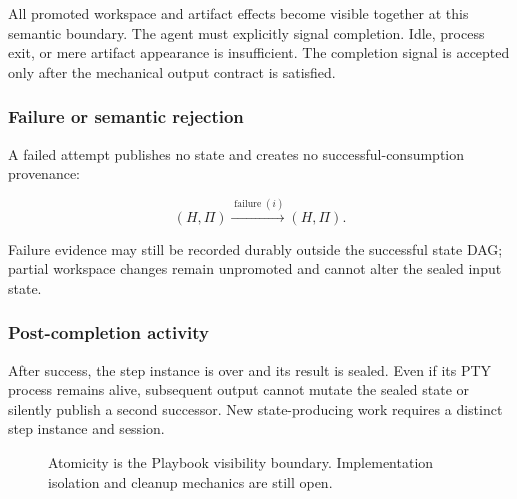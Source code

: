 \documentclass[11pt]{article}
\begin{document}
All promoted workspace and artifact effects become visible together at this semantic boundary. The agent must explicitly signal completion. Idle, process exit, or mere artifact appearance is insufficient. The completion signal is accepted only after the mechanical output contract is satisfied.

\subsubsection{Failure or semantic rejection}

A failed attempt publishes no state and creates no successful-consumption provenance:

\begin{equation}
  (H,\Pi) \xrightarrow{\operatorname{failure}(i)} (H,\Pi).
\end{equation}

Failure evidence may still be recorded durably outside the successful state DAG; partial workspace changes remain unpromoted and cannot alter the sealed input state.

\subsubsection{Post-completion activity}

After success, the step instance is over and its result is sealed. Even if its PTY process remains alive, subsequent output cannot mutate the sealed state or silently publish a second successor. New state-producing work requires a distinct step instance and session.

\begin{figure}[ht]
\centering
{}
\caption{Atomicity is the Playbook visibility boundary. Implementation isolation and cleanup mechanics are still open.}
\end{figure}
\end{document}
